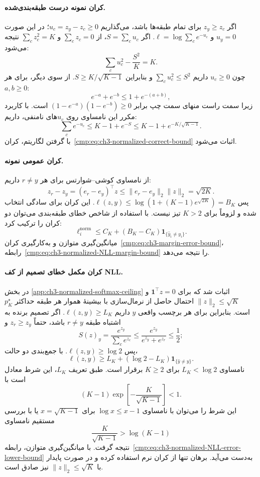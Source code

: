 \paragraph{کران نمونه درست طبقه‌بندی‌شده.}
اگر $z_y\ge z_c$ برای تمام طبقه‌ها باشد، می‌گذاریم $u_c=z_y-z_c\ge0$؛ در این صورت $u_y=0$ و $\ell=\log\sum_ce^{-u_c}$. اگر $S=\sum_cu_c$، از $\sum_cz_c=0$ و $\sum_cz_c^2=K$ نتیجه می‌شود:
\begin{equation}\label{eq:app-ch3-normalized-S}
\sum_cu_c^2-\frac{S^2}{K}=K.
\end{equation}
چون $u_c\ge0$ داریم $\sum_cu_c^2\le S^2$ و بنابراین $S\ge K/\sqrt{K-1}$. از سوی دیگر، برای هر $a,b\ge0$:
\[
e^{-a}+e^{-b}\le1+e^{-(a+b)},
\]
زیرا سمت راست منهای سمت چپ برابر $(1-e^{-a})(1-e^{-b})\ge0$ است. با کاربرد مکرر این نامساوی روی $u_c$های نامنفی، داریم:
\begin{equation}\label{eq:app-ch3-normalized-C}
\sum_ce^{-u_c}
\le K-1+e^{-S}
\le K-1+e^{-K/\sqrt{K-1}}.
\end{equation}
با گرفتن لگاریتم، کران~\eqref{cmp:eq:ch3-normalized-correct-bound} اثبات می‌شود.

\paragraph{کران عمومی نمونه.}
از نامساوی کوشی--شوارتس برای هر $r\ne y$ داریم:
\[
z_r-z_y
=(e_r-e_y)^\top z
\le\|e_r-e_y\|_2\|z\|_2
=\sqrt{2K}.
\]
پس $\ell(z,y)\le\log(1+(K-1)e^{\sqrt{2K}})=B_K$. این کران برای سادگی انتخاب شده و لزوماً برای $K>2$ تیز نیست. با استفاده از شاخص خطای طبقه‌بندی می‌توان دو کران را ترکیب کرد:
\[
\ell_i^{\mathrm{norm}}
\le C_K+(B_K-C_K)\mathbf1_{\{\widehat y_i\ne y_i\}}.
\]
میانگین‌گیری متوازن و به‌کارگیری کران~\eqref{cmp:eq:ch3-margin-error-bound}، رابطه~\eqref{cmp:eq:ch3-normalized-NLL-margin-bound} را نتیجه می‌دهد.


\paragraph{کران مکمل خطای تصمیم از کف NLL.}
در بخش
\ref{app:ch3-normalized-softmax-ceiling}
اثبات شد که برای
$\mathbf1^\top z=0$
و $\|z\|_2\le\sqrt K$
احتمال حاصل از نرمال‌سازی با بیشینهٔ هموار هر طبقه
حداکثر $p_K^\star$ است.
بنابراین برای هر برچسب واقعی
$y$ داریم
$\ell(z,y)\ge L_K$.
اگر تصمیم برنده به اشتباه
طبقه $r\ne y$ باشد،
حتماً $z_r\ge z_y$ و
\[
S(z)_y
=\frac{e^{z_y}}{\sum_ce^{z_c}}
\le\frac{e^{z_y}}{e^{z_y}+e^{z_r}}
\le\frac12;
\]
پس $\ell(z,y)\ge\log2$.
با جمع‌بندی دو حالت،
\[
\ell(z,y)\ge L_K+
(\log2-L_K)\mathbf1_{\{\widehat y\ne y\}}.
\]
نامساوی $L_K<\log2$ برای $K\ge2$ برقرار است.
طبق تعریف $L_K$، این شرط معادل است با
\[
(K-1)\exp\left[-\frac{K}{\sqrt{K-1}}\right]<1.
\]
این شرط را می‌توان با نامساوی
$\log x\le x-1$ برای $x=\sqrt{K-1}$
یا با بررسی مستقیم نامساوی
\[
\frac{K}{\sqrt{K-1}}>\log(K-1)
\]
نتیجه گرفت. با میانگین‌گیری متوازن،
رابطه~\eqref{cmp:eq:ch3-normalized-NLL-error-lower-bound}
به‌دست می‌آید.
برهان تنها از کران نرم
استفاده کرده و در
صورت پایدار با
$\|z\|_2\le\sqrt K$
نیز صادق است.

